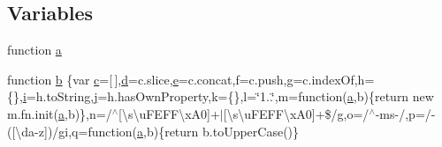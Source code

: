 \subsection*{Variables}
\begin{DoxyCompactItemize}
\item 
function \hyperlink{a00030_aa4d4888597588a84fd5b1184d00c91f3}{a}
\item 
function \hyperlink{a00030_ac0431efac4d7c393d1e70b86115cb93f}{b} \{var \hyperlink{a00029_ad9d1ac02e33c4aed62ad517a7cb8b3fb}{c}=\mbox{[}$\,$\mbox{]},\hyperlink{a00029_aeb337d295abaddb5ec3cb34cc2e2bbc9}{d}=c.\+slice,\hyperlink{a00029_ab5902775854a8b8440bcd25e0fe1c120}{e}=c.\+concat,f=c.\+push,g=c.\+index\+Of,h=\{\},\hyperlink{a00008_a6dbbc96f4222af2f6c18c8e60f41726b}{i}=h.\+to\+String,\hyperlink{a00008_ac86694252f8dfdb19aaeadc4b7c342c6}{j}=h.\+has\+Own\+Property,k=\{\},l=\char`\"{}1..\char`\"{},m=function(\hyperlink{a00029_a1f5870dcf487187f13d5fd328ed9e6e7}{a},b)\{return new m.\+fn.\+init(\hyperlink{a00029_a1f5870dcf487187f13d5fd328ed9e6e7}{a},b)\},n=/$^\wedge$\mbox{[}\textbackslash{}s\textbackslash{}u\+F\+E\+F\+F\textbackslash{}x\+A0\mbox{]}+$\vert$\mbox{[}\textbackslash{}s\textbackslash{}u\+F\+E\+F\+F\textbackslash{}x\+A0\mbox{]}+\$/g,o=/$^\wedge$-\/ms-\//,p=/-\/(\mbox{[}\textbackslash{}da-\/z\mbox{]})/gi,q=function(\hyperlink{a00029_a1f5870dcf487187f13d5fd328ed9e6e7}{a},b)\{return b.\+to\+Upper\+Case()\}
\item 

\end{DoxyCompactItemize}
